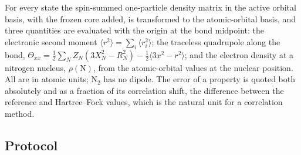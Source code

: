 \documentclass[11pt]{article}
\begin{document}
For every state the spin-summed one-particle density matrix in the active orbital basis, with the frozen core added, is transformed to the atomic-orbital basis, and three quantities are evaluated with the origin at the bond midpoint: the electronic second moment $\langle r^{2}\rangle=\sum_i\langle r_i^{2}\rangle$; the traceless quadrupole along the bond, $\Theta_{xx}=\tfrac12\sum_N Z_N(3X_N^{2}-R_N^{2})-\tfrac12\langle 3x^{2}-r^{2}\rangle$; and the electron density at a nitrogen nucleus, $\rho(\mathrm{N})$, from the atomic-orbital values at the nuclear position. All are in atomic units; N$_2$ has no dipole. The error of a property is quoted both absolutely and as a fraction of its correlation shift, the difference between the reference and Hartree--Fock values, which is the natural unit for a correlation method.

\subsection{Protocol}\label{sec:2.4}
\end{document}
